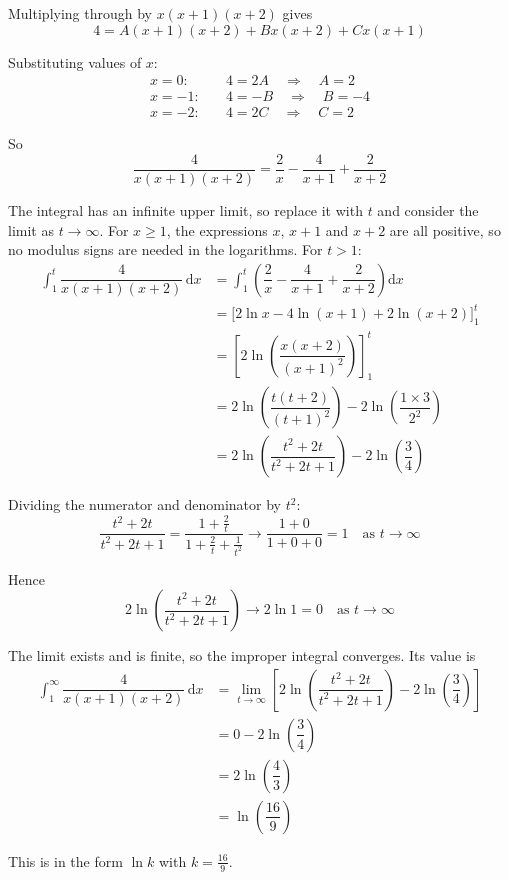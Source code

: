 \documentclass[leqno]{article}
\begin{document}
\begin{enumerate}[
  label=\textbf{\arabic*.},
  leftmargin=*,
  topsep=0pt,
  partopsep=0pt,
  parsep=0pt
]
\begin{djsSolution}
Multiplying through by \(x(x+1)(x+2)\) gives
\[
4=A(x+1)(x+2)+Bx(x+2)+Cx(x+1)
\]

Substituting values of \(x\):
\begin{align*}
x=0:&\quad 4=2A\quad\Longrightarrow\quad A=2\\
x=-1:&\quad 4=-B\quad\Longrightarrow\quad B=-4\\
x=-2:&\quad 4=2C\quad\Longrightarrow\quad C=2
\end{align*}

So
\[
\dfrac{4}{x(x+1)(x+2)}=\dfrac{2}{x}-\dfrac{4}{x+1}+\dfrac{2}{x+2}
\]

The integral has an infinite upper limit, so replace it with \(t\) and consider the limit as \(t\to\infty\). For \(x\ge 1\), the expressions \(x\), \(x+1\) and \(x+2\) are all positive, so no modulus signs are needed in the logarithms. For \(t>1\):
\begin{align*}
\int_1^{t}\dfrac{4}{x(x+1)(x+2)}\,\mathrm{d}x
&=\int_1^{t}\left(\dfrac{2}{x}-\dfrac{4}{x+1}+\dfrac{2}{x+2}\right)\mathrm{d}x\\
&=\Big[2\ln x-4\ln(x+1)+2\ln(x+2)\Big]_1^{t}\\
&=\left[2\ln\left(\dfrac{x(x+2)}{(x+1)^2}\right)\right]_1^{t}\\
&=2\ln\left(\dfrac{t(t+2)}{(t+1)^2}\right)-2\ln\left(\dfrac{1\times3}{2^2}\right)\\
&=2\ln\left(\dfrac{t^2+2t}{t^2+2t+1}\right)-2\ln\left(\dfrac{3}{4}\right)
\end{align*}

Dividing the numerator and denominator by \(t^2\):
\[
\dfrac{t^2+2t}{t^2+2t+1}=\dfrac{1+\frac{2}{t}}{1+\frac{2}{t}+\frac{1}{t^2}}\to\dfrac{1+0}{1+0+0}=1\quad\text{as } t\to\infty
\]

Hence
\[
2\ln\left(\dfrac{t^2+2t}{t^2+2t+1}\right)\to 2\ln 1=0\quad\text{as } t\to\infty
\]

The limit exists and is finite, so the improper integral converges. Its value is
\begin{align*}
\int_1^{\infty}\dfrac{4}{x(x+1)(x+2)}\,\mathrm{d}x
&=\lim_{t\to\infty}\left[2\ln\left(\dfrac{t^2+2t}{t^2+2t+1}\right)-2\ln\left(\dfrac{3}{4}\right)\right]\\
&=0-2\ln\left(\dfrac{3}{4}\right)\\
&=2\ln\left(\dfrac{4}{3}\right)\\
&=\ln\left(\dfrac{16}{9}\right)
\end{align*}

This is in the form \(\ln k\) with \(k=\frac{16}{9}\).
\end{djsSolution}


\end{enumerate}
\end{document}
